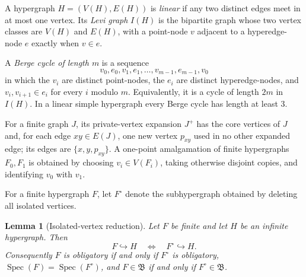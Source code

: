 \documentclass[11pt]{amsart}
\newtheorem{lemma}[lemma]{Lemma}
\theoremstyle{definition}
\theoremstyle{remark}
\numberwithin{equation}{section}
\DeclareMathOperator{\Spec}{Spec}
\newcommand{\Bclass}{\mathfrak B}
\begin{document}
A hypergraph $H=(V(H),E(H))$ is \emph{linear} if any two distinct edges
meet in at most one vertex.  Its \emph{Levi graph} $I(H)$ is the
bipartite graph whose two vertex classes are $V(H)$ and $E(H)$, with a
point-node $v$ adjacent to a hyperedge-node $e$ exactly when $v\in e$.

A \emph{Berge cycle of length $m$} is a sequence
\[
 v_0,e_0,v_1,e_1,\ldots,v_{m-1},e_{m-1},v_0
\]
in which the $v_i$ are distinct point-nodes, the $e_i$ are distinct
hyperedge-nodes, and $v_i,v_{i+1}\in e_i$ for every $i$ modulo $m$.
Equivalently, it is a cycle of length $2m$ in $I(H)$.  In a linear
simple hypergraph every Berge cycle has length at least $3$.

For a finite graph $J$, its private-vertex expansion $J^+$ has the core
vertices of $J$ and, for each edge $xy\in E(J)$, one new vertex $p_{xy}$
used in no other expanded edge; its edges are $\{x,y,p_{xy}\}$.  A
one-point amalgamation of finite hypergraphs $F_0,F_1$ is obtained by
choosing $v_i\in V(F_i)$, taking otherwise disjoint copies, and
identifying $v_0$ with $v_1$.

For a finite hypergraph $F$, let $F^\circ$ denote the subhypergraph
obtained by deleting all isolated vertices.

\begin{lemma}[Isolated-vertex reduction]
\label{lem:isolated-reduction}
Let $F$ be finite and let $H$ be an infinite hypergraph.  Then
\[
  F\hookrightarrow H\quad\Longleftrightarrow\quad F^\circ\hookrightarrow H.
\]
Consequently $F$ is obligatory if and only if $F^\circ$ is obligatory,
$\Spec(F)=\Spec(F^\circ)$, and $F\in\Bclass$ if and only if
$F^\circ\in\Bclass$.
\end{lemma}
\end{document}
